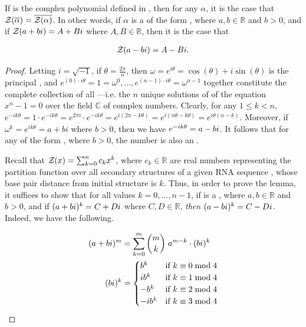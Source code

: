 \begin{lemma}
\label{lem:fftbor:compconj}

If \fullZx is the complex polynomial defined in
, then for any \nRoU
 $\alpha$, it is the case that ${\mathcal Z}_{}(\overline{\alpha}) =
\overline{{\mathcal Z}_{}(\alpha)}$. In other words, if $\alpha$ is a \nRoU
 of the form \aPbi, where $a,b \in \mathbb{R}$ and $b>0$, and
if ${\mathcal Z}_{}(a+bi) = A + Bi$ where $A,B \in \mathbb{R}$, then it is the case that

\begin{align}
{\mathcal Z}_{}(a-bi) = A - Bi.
\end{align}

\end{lemma}

\begin{proof}
Letting $i = \sqrt{-1}$, if
$\theta = \frac{2 \pi}{n}$, then
$\omega = e^{i \theta} = \cos(\theta) + i \sin(\theta)$
is the principal \nRoU, and
$e^{(0) \cdot i \theta} = 1 = \omega^{0}, \dots ,
e^{(n-1) \cdot i \theta} = \omega^{n-1}$ together
constitute the complete collection of all
\nRoUs---i.e. the $n$ unique solutions of
of the equation $x^n -1 = 0$ over the field $\mathbb{C}$ of complex numbers.
Clearly, for any $1 \leq k < n$,
$e^{-i k \theta} = 1 \cdot e^{-i k \theta} =
e^{2 \pi i} \cdot e^{-i k \theta} = e^{i(2 \pi - k \theta)} =
e^{i(n \theta - k \theta)} = e^{i \theta (n - k)}$.
Moreover, if $\omega^k = e^{i k \theta} = a + b i$ where
$b>0$, then we have $e^{-i k \theta} = a-bi$. It follows that for any
\nRoU of the form \aPbi, where $b>0$, the number \aMbi
is also an \nRoU.

Recall that ${\mathcal Z}_{}(x) = \sum_{k=0}^n c_k x^k$, where
$c_k \in \mathbb{R}$ are real numbers representing the partition function
 over
all secondary structures of a given RNA sequence \seqN,
whose base pair distance from initial structure
\strSt is $k$. Thus, in order to prove the lemma, it suffices to show
that for all values $k=0,\dots,n-1$, if \aPbi is a
\nRoU, where $a,b \in \mathbb{R}$
and $b>0$, and if $(a+bi)^k = C+Di$ where $C,D \in \mathbb{R}$, {\em then}
$(a-bi)^k = C-Di$. Indeed, we have the following.

\begin{align}
\begin{split}
(a+bi)^m &= \sum_{k=0}^m {m \choose k}\; a^{m-k} \cdot (bi)^k \\
(bi)^k  &=
\begin{cases}
b^k    & \text{if $k \equiv 0 \bmod 4$} \\
i b^k  & \text{if $k \equiv 1 \bmod 4$} \\
-b^k   & \text{if $k \equiv 2 \bmod 4$} \\
-i b^k & \text{if $k \equiv 3 \bmod 4$} \\
\end{cases}
\end{split}
\end{align}


\end{proof}
